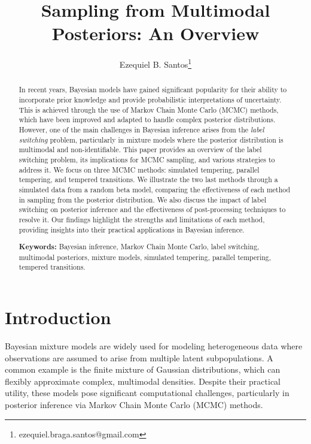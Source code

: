 \documentclass[11pt]{article}
\title{Sampling from Multimodal Posteriors: An Overview}
\author{Ezequiel B. Santos\thanks{ezequiel.braga.santos@gmail.com}}
\affil{School of Applied Mathematics - Getulio Vargas Foundation (FGV EMAp)}
\date{}
\begin{document}
\maketitle

\begin{abstract}

In recent years, Bayesian models have gained significant popularity for their ability to incorporate prior 
knowledge and provide probabilistic interpretations of uncertainty. This is achieved through the use of
Markov Chain Monte Carlo (MCMC) methods, which have been improved and adapted to handle complex posterior
distributions. However, one of the main challenges in Bayesian inference arises from the 
\textit{label switching} problem, particularly in mixture models where the posterior distribution is
multimodal and non-identifiable. This paper provides an overview of the label switching problem, its 
implications for MCMC sampling, and various strategies to address it. We focus on three MCMC methods:
simulated tempering, parallel tempering, and tempered transitions. We illustrate the two last methods through a 
simulated data from a random beta model, comparing the effectiveness of each method in
sampling from the posterior distribution. We also discuss the impact of label switching on posterior inference
and the effectiveness of post-processing techniques to resolve it. Our findings highlight the strengths and
limitations of each method, providing insights into their practical applications in Bayesian inference.

\textbf{Keywords:} Bayesian inference, Markov Chain Monte Carlo, label switching, multimodal posteriors,
mixture models, simulated tempering, parallel tempering, tempered transitions.

\end{abstract}

\section{Introduction}

Bayesian mixture models are widely used for modeling heterogeneous data where observations are assumed to arise 
from multiple latent subpopulations. A common example is the finite mixture of Gaussian distributions, which can 
flexibly approximate complex, multimodal densities. Despite their practical utility, these models pose significant 
computational challenges, particularly in posterior inference via Markov Chain Monte Carlo (MCMC) methods.
\end{document}
